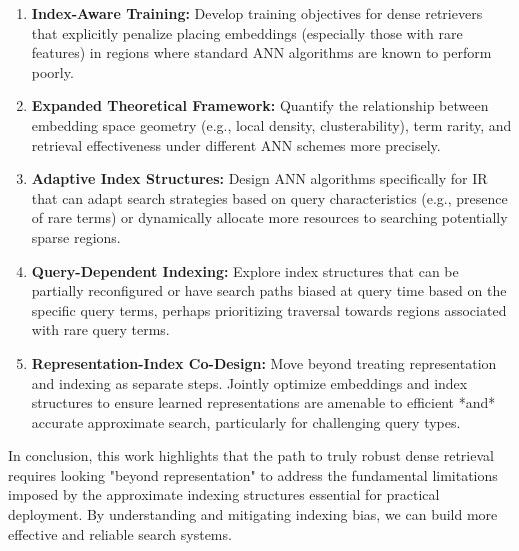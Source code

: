 \documentclass[manuscript]{acmart}
\begin{document}
\begin{enumerate}
    \item \textbf{Index-Aware Training:} Develop training objectives for dense retrievers that explicitly penalize placing embeddings (especially those with rare features) in regions where standard ANN algorithms are known to perform poorly.
    \item \textbf{Expanded Theoretical Framework:} Quantify the relationship between embedding space geometry (e.g., local density, clusterability), term rarity, and retrieval effectiveness under different ANN schemes more precisely.
    \item \textbf{Adaptive Index Structures:} Design ANN algorithms specifically for IR that can adapt search strategies based on query characteristics (e.g., presence of rare terms) or dynamically allocate more resources to searching potentially sparse regions.
    \item \textbf{Query-Dependent Indexing:} Explore index structures that can be partially reconfigured or have search paths biased at query time based on the specific query terms, perhaps prioritizing traversal towards regions associated with rare query terms.
    \item \textbf{Representation-Index Co-Design:} Move beyond treating representation and indexing as separate steps. Jointly optimize embeddings and index structures to ensure learned representations are amenable to efficient *and* accurate approximate search, particularly for challenging query types.
\end{enumerate}

In conclusion, this work highlights that the path to truly robust dense retrieval requires looking "beyond representation" to address the fundamental limitations imposed by the approximate indexing structures essential for practical deployment. By understanding and mitigating indexing bias, we can build more effective and reliable search systems.


\end{document}
